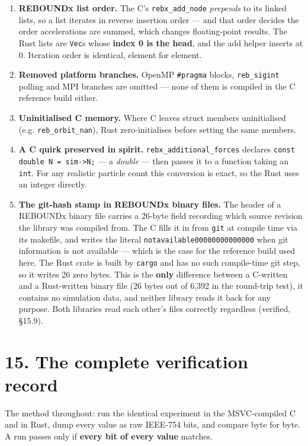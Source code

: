 \documentclass[11pt]{article}
\begin{document}
\begin{enumerate}
\item \textbf{REBOUNDx list order.} The C's \texttt{rebx\_add\_node} \emph{prepends} to its linked lists, so a list iterates in reverse insertion order --- and that order decides the order accelerations are summed, which changes floating-point results. The Rust lists are \texttt{Vec}s whose \textbf{index 0 is the head}, and the add helper inserts at 0. Iteration order is identical, element for element.
\item \textbf{Removed platform branches.} OpenMP \texttt{\#pragma} blocks, \texttt{reb\_sigint} polling and MPI branches are omitted --- none of them is compiled in the C reference build either.
\item \textbf{Uninitialised C memory.} Where C leaves struct members uninitialised (e.g. \texttt{reb\_orbit\_nan}), Rust zero-initialises before setting the same members.
\item \textbf{A C quirk preserved in spirit.} \texttt{rebx\_additional\_forces} declares \texttt{const double N = sim->N;} --- a \emph{double} --- then passes it to a function taking an \texttt{int}. For any realistic particle count this conversion is exact, so the Rust uses an integer directly.
\item \textbf{The git-hash stamp in REBOUNDx binary files.} The header of a REBOUNDx binary file carries a 26-byte field recording which source revision the library was compiled from. The C fills it in from \texttt{git} at compile time via its makefile, and writes the literal \texttt{notavailable00000000000000} when git information is not available --- which is the case for the reference build used here. The Rust crate is built by \texttt{cargo} and has no such compile-time git step, so it writes 26 zero bytes. This is the \textbf{only} difference between a C-written and a Rust-written binary file (26 bytes out of 6,392 in the round-trip test), it contains no simulation data, and neither library reads it back for any purpose. Both libraries read each other's files correctly regardless (verified, \S{}15.9).
\end{enumerate}

\section{15. The complete verification record}

The method throughout: run the identical experiment in the MSVC-compiled C and in Rust, dump every value as raw IEEE-754 bits, and compare byte for byte. A run passes only if \textbf{every bit of every value} matches.
\end{document}
